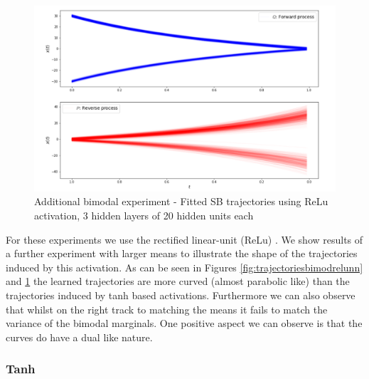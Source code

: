 \documentclass[a4paper,12pt,twoside,openright]{report}
\theoremstyle{definition}
\begin{document}
\begin{figure}
    \centering
    \includegraphics[scale=0.7,trim={0cm 0cm 0cm 0}, clip]{images/Control/almost_perfect_bimodal_relu.PNG}
    \caption{ Additional bimodal experiment - Fitted SB  trajectories using ReLu activation, 3 hidden layers of 20 hidden units each}
    \label{fig:trajectoriesbimodrelunn_}
\end{figure}

For these experiments we use the rectified linear-unit (ReLu) \citep{glorot2011deep}. We show results of a further experiment with larger means to illustrate the shape of the trajectories induced by this activation. As can be seen in Figures \ref{fig:trajectoriesbimodrelunn} and \ref{fig:trajectoriesbimodrelunn_} the learned trajectories are more curved (almost parabolic like) than the trajectories induced by tanh based activations. Furthermore we can also observe  that whilst on the right track to matching the means it fails to match the variance of the bimodal marginals. One positive aspect we can observe is that the curves do have a dual like nature.

\subsubsection{Tanh}
\end{document}
